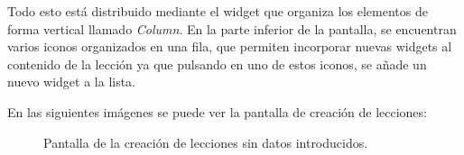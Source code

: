 Todo esto está distribuido mediante el widget que organiza los elementos de forma vertical llamado \textit{Column}. 
En la parte inferior de la pantalla, se encuentran varios iconos organizados en una fila, que permiten incorporar nuevas widgets al contenido de la lección
ya que pulsando en uno de estos iconos, se añade un nuevo widget a la lista.

En las siguientes imágenes se puede ver la pantalla de creación de lecciones:

\begin{figure}[H]%
  \centering
  \qquad
  \caption{Pantalla de la creación de lecciones sin datos introducidos.}%
  \label{fig:creacionleccionvacia}%
\end{figure}


